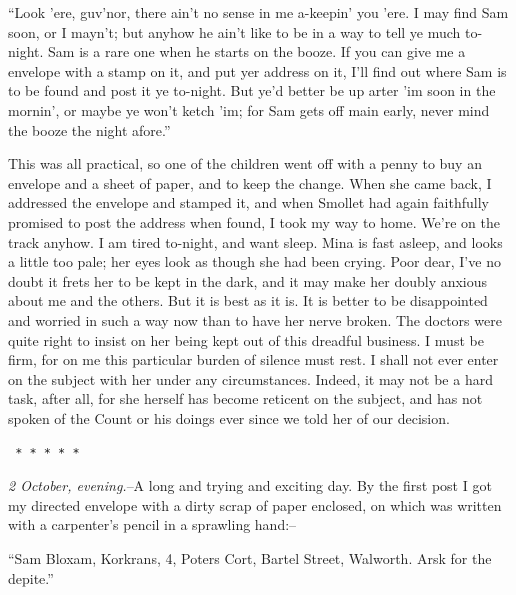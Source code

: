 \documentclass[12pt,openright]{book}
\begin{document}
“Look ’ere, guv’nor, there ain’t no sense in me a-keepin’ you ’ere. I may find Sam soon, or I mayn’t; but anyhow he ain’t like to be in a way to tell ye much to-night. Sam is a rare one when he starts on the booze. If you can give me a envelope with a stamp on it, and put yer address on it, I’ll find out where Sam is to be found and post it ye to-night. But ye’d better be up arter ’im soon in the mornin’, or maybe ye won’t ketch ’im; for Sam gets off main early, never mind the booze the night afore.”

This was all practical, so one of the children went off with a penny to buy an envelope and a sheet of paper, and to keep the change. When she came back, I addressed the envelope and stamped it, and when Smollet had again faithfully promised to post the address when found, I took my way to home. We’re on the track anyhow. I am tired to-night, and want sleep. Mina is fast asleep, and looks a little too pale; her eyes look as though she had been crying. Poor dear, I’ve no doubt it frets her to be kept in the dark, and it may make her doubly anxious about me and the others. But it is best as it is. It is better to be disappointed and worried in such a way now than to have her nerve broken. The doctors were quite right to insist on her being kept out of this dreadful business. I must be firm, for on me this particular burden of silence must rest. I shall not ever enter on the subject with her under any circumstances. Indeed, it may not be a hard task, after all, for she herself has become reticent on the subject, and has not spoken of the Count or his doings ever since we told her of our decision.

\texttt{   *       *       *       *       *}

\textit{2 October, evening.}–A long and trying and exciting day. By the first post I got my directed envelope with a dirty scrap of paper enclosed, on which was written with a carpenter’s pencil in a sprawling hand:–

“Sam Bloxam, Korkrans, 4, Poters Cort, Bartel Street, Walworth. Arsk for the depite.”
\end{document}
